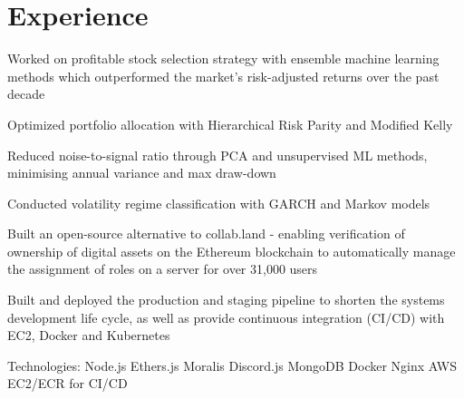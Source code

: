 \documentclass[]{cv}
\begin{document}
\hfill
\begin{minipage}[t]{0.66\textwidth} 


\section{Experience}
\subtitle{March 2022 - July 2022 | Singapore}
\vspace{\topsep} %
\begin{tightemize}
\item Worked on profitable stock selection strategy with ensemble machine learning methods which outperformed the market’s risk-adjusted returns over the past decade
\item Optimized portfolio allocation with Hierarchical Risk Parity and Modified Kelly
\item Reduced noise-to-signal ratio through PCA and unsupervised ML methods, minimising annual variance and max draw-down
\item Conducted volatility regime classification with GARCH and Markov models
\end{tightemize}
\sectionsep

\subtitle{April 2022 – July 2022 | Singapore}
\begin{tightemize}
\item Built an open-source alternative to collab.land - enabling verification of ownership of digital assets on the Ethereum blockchain to automatically manage the assignment of roles on a server for over 31,000 users
\item Built and deployed the production and staging pipeline to shorten the systems development life cycle, as well as provide continuous integration (CI/CD) with EC2, Docker and Kubernetes
\item Technologies: Node.js \textbullet{} Ethers.js \textbullet{} Moralis \textbullet{} Discord.js \textbullet{} MongoDB \textbullet{} Docker \textbullet{} Nginx \textbullet{} AWS EC2/ECR for CI/CD
\end{tightemize}
\sectionsep


\end{minipage}
\end{document}
